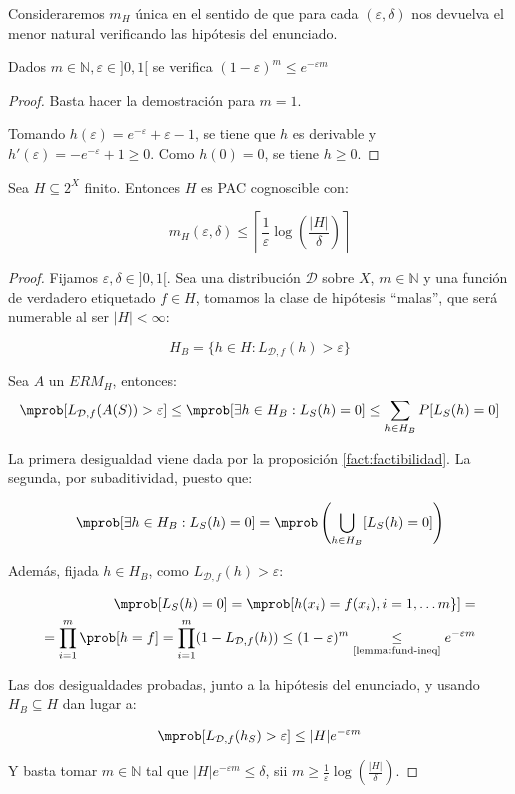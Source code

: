 Consideraremos $m_{H}$ única en el sentido de que para cada $(\varepsilon, \delta)$ nos devuelva el menor natural
verificando las hipótesis del enunciado.

\begin{lemma}
 Dados $m\in \mathbb{N}, \varepsilon\in ]0,1[$ se verifica $(1-\varepsilon)^m \le e^{-\varepsilon m}$
 \label{lemma:fund-ineq}
\end{lemma}
\begin{proof}
 Basta hacer la demostración para $m=1$.
 
 Tomando $h(\varepsilon) = e^{-\varepsilon} + \varepsilon - 1$, se tiene que $h$ es derivable y 
 $h'(\varepsilon) = -e^{-\varepsilon} + 1 \ge 0$. Como $h(0) = 0$, se tiene $h \ge 0$.
\end{proof}

\begin{theorem}
Sea $H \subseteq 2^{X}$ finito. Entonces $H$ es PAC cognoscible con:

\[m_H(\varepsilon, \delta) \le \left\lceil \frac{1}{\varepsilon} \log\left(\frac{|H|}{\delta} \right) \right\rceil\]
\label{th:finitas-pac}
\end{theorem}

  \begin{proof}
  Fijamos $\varepsilon, \delta \in ]0,1[$. Sea una distribución $\mathcal{D}$ sobre $X$, $m\in \mathbb{N}$ y una función de verdadero 
  etiquetado $f\in H$, tomamos la clase de hipótesis ``malas'', que será numerable al ser $|H| < \infty$:

  \[H_B = \{h\in H: L_{\mathcal{D},f}(h) > \varepsilon\}\]

  Sea $A$ un $ERM_{H}$, entonces:
  \[\mprob [L_{\mathcal{D},f}(A(S)) > \varepsilon] \le \mprob 
  [\exists h\in H_B : L_S(h) = 0] \le \sum_{h\in H_B} P [L_S(h) = 0] \]

  La primera desigualdad viene dada por la proposición \ref{fact:factibilidad}. La segunda, por subaditividad, puesto que:
  
  \[\mprob [\exists h\in H_B : L_S(h) = 0] = \mprob \left(\underset{h\in H_B}{\bigcup} [L_S(h) = 0]\right)\]

  Además, fijada $h\in H_B$, como $L_{\mathcal{D},f}(h) > \varepsilon$:

  \begin{align*}
  \mprob[L_S(h) = 0] = \mprob[h(x_i) = f(x_i), i =1,\ldots m\}] =\\
  = \prod_{i=1}^m \prob[h = f] = \prod_{i=1}^m (1 - L_{\mathcal{D},f}(h)) \le (1-\varepsilon)^m 
  \underset{\textrm{\ref{lemma:fund-ineq}}}{\le} e^{-\varepsilon m}
  \end{align*}


  Las dos desigualdades probadas, junto a la hipótesis del enunciado, y usando $H_B \subseteq H$ dan lugar a:

  \[\mprob[L_{\mathcal{D},f}(h_S) > \varepsilon] \le |H|e^{-\varepsilon m}\]
  
  Y basta tomar $m\in \mathbb{N}$ tal que $|H|e^{-\varepsilon m} \le \delta$, sii 
  $m\ge \frac{1}{\varepsilon} \log\left(\frac{|H|}{\delta}\right)$.
  \end{proof}

